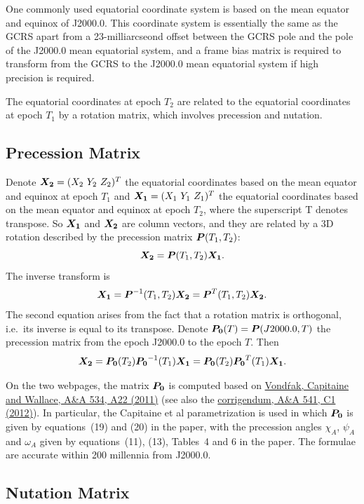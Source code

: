 \documentclass[12pt]{article}
\newcommand \beq {\begin{equation}}
\newcommand \eeq {\end{equation}}
\newcommand{\ve}[1]{\mbox{\boldmath $#1$}}
\begin{document}
One commonly used equatorial coordinate system is based on the mean equator and 
equinox of J2000.0. This coordinate system is essentially the same as the GCRS 
apart from a 23-milliarcseond offset between the GCRS pole and the pole of 
the J2000.0 mean equatorial system, and a frame bias matrix is required to 
transform from the GCRS to the J2000.0 mean equatorial system if high precision
is required.

The equatorial coordinates at epoch $T_2$ are related to the equatorial coordinates 
at epoch $T_1$ by a rotation matrix, which involves precession and nutation. 

\subsection{Precession Matrix}

Denote $\ve{X_2}=(X_2\ Y_2\ Z_2)^T$ the equatorial coordinates based on 
the mean equator and equinox at epoch $T_1$ and $\ve{X_1}=(X_1\ Y_1\ Z_1)^T$ 
the equatorial coordinates based on the mean equator and equinox at epoch $T_2$,
where the superscript T denotes transpose. So $\ve{X_1}$ and $\ve{X_2}$ are column 
vectors, and they are related by a 3D rotation described by the precession matrix 
$\ve{P}(T_1,T_2)$: 
\beq
  \ve{X_2} = \ve{P}(T_1,T_2) \ve{X_1} . 
\eeq
The inverse transform is 
\beq
  \ve{X_1} = \ve{P}^{-1}(T_1,T_2) \ve{X_2} = \ve{P}^T(T_1,T_2) \ve{X_2} .
\eeq
The second equation arises from the fact that a rotation matrix is orthogonal, 
i.e.\ its inverse is equal to its transpose. Denote $\ve{P_0}(T)=\ve{P}(J2000.0,T)$ 
the precession matrix from the epoch J2000.0 to the epoch $T$. Then 
\beq
  \ve{X_2} = \ve{P_0}(T_2)\ve{P_0}^{-1}(T_1) \ve{X_1} = 
\ve{P_0}(T_2) \ve{P_0}^T(T_1) \ve{X_1} .
\eeq

On the two webpages, the matrix $\ve{P_0}$ is computed based on 
\href{http://adsabs.harvard.edu/abs/2011A%26A...534A..22V}{Vond\'rak, 
Capitaine and Wallace, A\&A 534, A22 (2011)} (see also the 
\href{https://www.aanda.org/articles/aa/pdf/2012/05/aa17274e-11.pdf}{corrigendum, 
A\&A 541, C1 (2012)}). In particular, the Capitaine et al parametrization is used in which 
$\ve{P_0}$ is given by equations~(19) and (20) in the paper, with the precession 
angles $\chi_A$, $\psi_A$ and $\omega_A$ given by equations~(11), (13), Tables~4 and 6 
in the paper. The formulae are accurate within 200 millennia from J2000.0. 

\subsection{Nutation Matrix} 
\label{sec:nutation}
\end{document}
